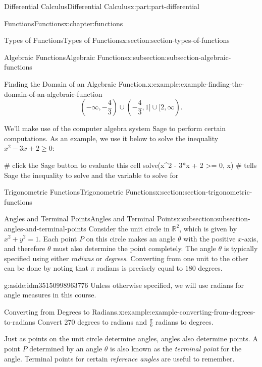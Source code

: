 \documentclass[twoside,10pt,]{tufte-book}
\numberwithin{equation}{part}
\newcommand{\RR}{\mathbb{R}}
\begin{document}
\begin{partptx}{Differential Calculus}{}{Differential Calculus}{}{}{x:part:part-differential}
\begin{chapterptx}{Functions}{}{Functions}{}{}{x:chapter:functions}
\begin{sectionptx}{Types of Functions}{}{Types of Functions}{}{}{x:section:section-types-of-functions}
\begin{subsectionptx}{Algebraic Functions}{}{Algebraic Functions}{}{}{x:subsection:subsection-algebraic-functions}
\begin{example}{Finding the Domain of an Algebraic Function.}{x:example:example-finding-the-domain-of-an-algebraic-function}
\begin{equation*}
(-\infty, -\frac{4}{3})\cup (-\frac{4}{3}, 1]\cup[2,\infty)\text{.}
\end{equation*}
%
\end{example}
We'll make use of the computer algebra system Sage to perform certain computations. As an example, we use it below to solve the inequality \(x^{2} - 3x + 2 \geq 0\):%
\begin{sageinput}
# click the Sage button to evaluate this cell
solve(x^2 - 3*x + 2 >= 0, x)    # tells Sage the inequality to solve and the variable to solve for
\end{sageinput}
\end{subsectionptx}
\end{sectionptx}
%
%
\typeout{************************************************}
\typeout{************************************************}
%
\begin{sectionptx}{Trigonometric Functions}{}{Trigonometric Functions}{}{}{x:section:section-trigonometric-functions}
%
%
\typeout{************************************************}
\typeout{************************************************}
%
\begin{subsectionptx}{Angles and Terminal Points}{}{Angles and Terminal Points}{}{}{x:subsection:subsection-angles-and-terminal-points}
Consider the unit circle in \(\RR^2\), which is given by \(x^2 + y^2 = 1\). Each point \(P\) on this circle makes an angle \(\theta\) with the positive \(x\)-axis, and therefore \(\theta\) must also determine the point completely. The angle \(\theta\) is typically specified using either \emph{radians} or \emph{degrees}. Converting from one unit to the other can be done by noting that \(\pi\) radians is precisely equal to \(180\) degrees. \begin{aside}{}{g:aside:idm35150998963776}%
Unless otherwise specified, we will use radians for angle measures in this course.%
\end{aside}
%
\begin{example}{Converting from Degrees to Radians.}{x:example:example-converting-from-degrees-to-radians}%
Convert \(270\) degrees to radians and \(\frac{\pi}{6}\) radians to degrees.%
\end{example}
Just as points on the unit circle determine angles, angles also determine points. A point \(P\) determined by an angle \(\theta\) is also known as the \emph{terminal point} for the angle. Terminal points for certain \emph{reference angles} are useful to remember.%

\end{subsectionptx}
\end{sectionptx}
\end{chapterptx}
\end{partptx}
\end{document}
